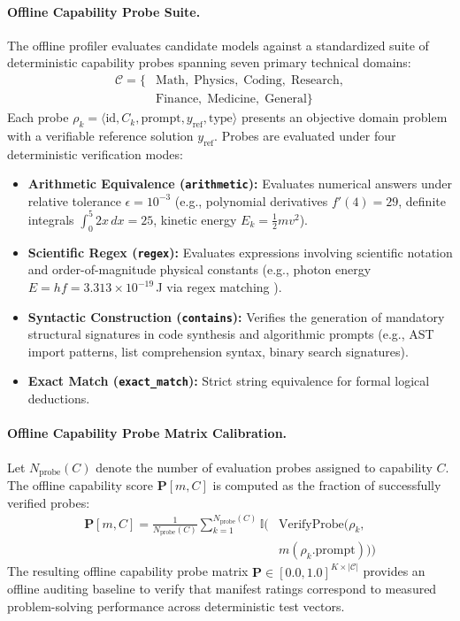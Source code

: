 \paragraph{Offline Capability Probe Suite.}
The offline profiler evaluates candidate models against a standardized suite of deterministic capability probes spanning seven primary technical domains:
\begin{equation}
\begin{aligned}
\mathcal{C} = \{&\text{Math}, \;\text{Physics}, \;\text{Coding}, \;\text{Research}, \\
&\text{Finance}, \;\text{Medicine}, \;\text{General}\}
\end{aligned}
\end{equation}
Each probe $\rho_k = \langle \text{id}, C_k, \text{prompt}, y_{\text{ref}}, \text{type} \rangle$ presents an objective domain problem with a verifiable reference solution $y_{\text{ref}}$. Probes are evaluated under four deterministic verification modes:
\begin{itemize}
    \item \textbf{Arithmetic Equivalence (\texttt{arithmetic}):} Evaluates numerical answers under relative tolerance $\epsilon = 10^{-3}$ (e.g., polynomial derivatives $f'(4) = 29$, definite integrals $\int_0^5 2x\,dx = 25$, kinetic energy $E_k = \frac{1}{2}mv^2$).
    \item \textbf{Scientific Regex (\texttt{regex}):} Evaluates expressions involving scientific notation and order-of-magnitude physical constants (e.g., photon energy $E = hf = 3.313 \times 10^{-19}$\,J via regex matching ).
    \item \textbf{Syntactic Construction (\texttt{contains}):} Verifies the generation of mandatory structural signatures in code synthesis and algorithmic prompts (e.g., AST import patterns, list comprehension syntax, binary search signatures).
    \item \textbf{Exact Match (\texttt{exact\_match}):} Strict string equivalence for formal logical deductions.
\end{itemize}

\paragraph{Offline Capability Probe Matrix Calibration.}
Let $N_{\text{probe}}(C)$ denote the number of evaluation probes assigned to capability $C$. The offline capability score $\mathbf{P}[m, C]$ is computed as the fraction of successfully verified probes:
\begin{equation}
\begin{aligned}
\mathbf{P}[m, C] = \frac{1}{N_{\text{probe}}(C)} \sum_{k=1}^{N_{\text{probe}}(C)} \mathbb{I}\Big(&\text{VerifyProbe}(\rho_k, \\
&m(\rho_k.\text{prompt}))\Big)
\end{aligned}
\label{eq:empirical_matrix}
\end{equation}
The resulting offline capability probe matrix $\mathbf{P} \in [0.0, 1.0]^{K \times |\mathcal{C}|}$ provides an offline auditing baseline to verify that manifest ratings correspond to measured problem-solving performance across deterministic test vectors.

